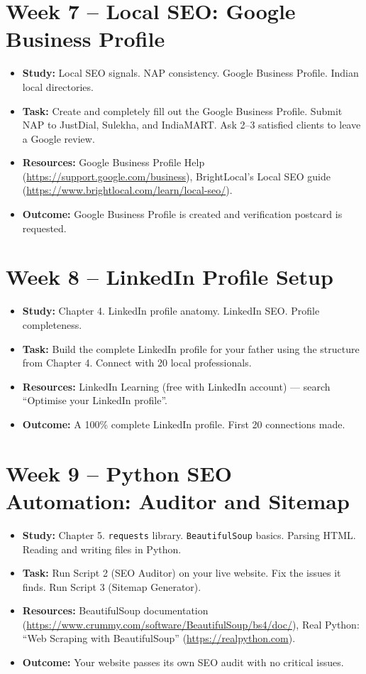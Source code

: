 \documentclass[12pt, a4paper]{book}
\begin{document}
\section{Week 7 -- Local SEO: Google Business Profile}
\begin{itemize}[leftmargin=1.5em]
  \item \textbf{Study:} Local SEO signals. NAP consistency. Google Business Profile.
        Indian local directories.
  \item \textbf{Task:} Create and completely fill out the Google Business Profile.
        Submit NAP to JustDial, Sulekha, and IndiaMART.
        Ask 2--3 satisfied clients to leave a Google review.
  \item \textbf{Resources:} Google Business Profile Help (\url{https://support.google.com/business}),
        BrightLocal's Local SEO guide (\url{https://www.brightlocal.com/learn/local-seo/}).
  \item \textbf{Outcome:} Google Business Profile is created and verification postcard is requested.
\end{itemize}

\section{Week 8 -- LinkedIn Profile Setup}
\begin{itemize}[leftmargin=1.5em]
  \item \textbf{Study:} Chapter 4. LinkedIn profile anatomy. LinkedIn SEO. Profile completeness.
  \item \textbf{Task:} Build the complete LinkedIn profile for your father using the structure
        from Chapter 4. Connect with 20 local professionals.
  \item \textbf{Resources:} LinkedIn Learning (free with LinkedIn account) --- search
        ``Optimise your LinkedIn profile''.
  \item \textbf{Outcome:} A 100\% complete LinkedIn profile. First 20 connections made.
\end{itemize}

\section{Week 9 -- Python SEO Automation: Auditor and Sitemap}
\begin{itemize}[leftmargin=1.5em]
  \item \textbf{Study:} Chapter 5. \texttt{requests} library. \texttt{BeautifulSoup} basics.
        Parsing HTML. Reading and writing files in Python.
  \item \textbf{Task:} Run Script 2 (SEO Auditor) on your live website.
        Fix the issues it finds. Run Script 3 (Sitemap Generator).
  \item \textbf{Resources:} BeautifulSoup documentation (\url{https://www.crummy.com/software/BeautifulSoup/bs4/doc/}),
        Real Python: ``Web Scraping with BeautifulSoup'' (\url{https://realpython.com}).
  \item \textbf{Outcome:} Your website passes its own SEO audit with no critical issues.
\end{itemize}
\end{document}
